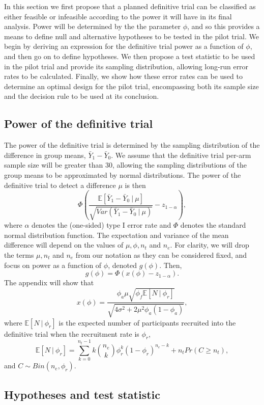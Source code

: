 \documentclass[AMA,STIX1COL]{WileyNJD-v2}
\begin{document}
In this section we first propose that a planned definitive trial can be classified as either feasible or infeasible according to the power it will have in its final analysis. Power will be determined by the the parameter $\phi$, and so this provides a means to define null and alternative hypotheses to be tested in the pilot trial. We begin by deriving an expression for the definitive trial power as a function of $\phi$, and then go on to define hypotheses. We then propose a test statistic to be used in the pilot trial and provide its sampling distribution, allowing long-run error rates to be calculated. Finally, we show how these error rates can be used to determine an optimal design for the pilot trial, encompassing both its sample size and the decision rule to be used at its conclusion.

\subsection{Power of the definitive trial}\label{sec:power}

The power of the definitive trial is determined by the sampling distribution of the difference in group means, $\bar{Y}_1 - \bar{Y}_0$. We assume that the definitive trial per-arm sample size will be greater than 30, allowing the sampling distributions of the group means to be approximated by normal distributions. The power of the definitive trial to detect a difference $\mu$ is then
$$
\Phi \left(\frac{\mathbb{E}[\bar{Y}_1 - \bar{Y}_0 ~|~ \mu]}{\sqrt{Var(\bar{Y}_1 - \bar{Y}_0 ~|~ \mu)}} - z_{1-\alpha} \right),
$$
where $\alpha$ denotes the (one-sided) type I error rate and $\Phi$ denotes the standard normal distribution function. The expectation and variance of the mean difference will depend on the values of $\mu, \phi, n_t$ and $n_e$. For clarity, we will drop the terms $\mu, n_t$ and $n_e$ from our notation as they can be considered fixed, and focus on power as a function of $\phi$, denoted $g(\phi)$. Then,
$$
g(\phi) = \Phi \left( x(\phi) - z_{1-\alpha} \right).
$$
The appendix will show that
$$
x(\phi) =  \frac{ \phi_a\mu \sqrt{\phi_f \mathbb{E}[N ~|~ \phi_r]} } {\sqrt{4\sigma^2 + 2 \mu^2 \phi_a(1-\phi_a)}},
$$
where $\mathbb{E}[N ~|~ \phi_r]$ is the expected number of participants recruited into the definitive trial when the recruitment rate is $\phi_r$,
$$
\mathbb{E}[N ~|~ \phi_r] = \sum_{k=0}^{n_t-1} k{n_e \choose k} \phi_r^k (1-\phi_r)^{n_e - k} + n_t Pr(C \geq n_t),
$$
and $C \sim Bin(n_e, \phi_r)$.

\subsection{Hypotheses and test statistic}
\end{document}
